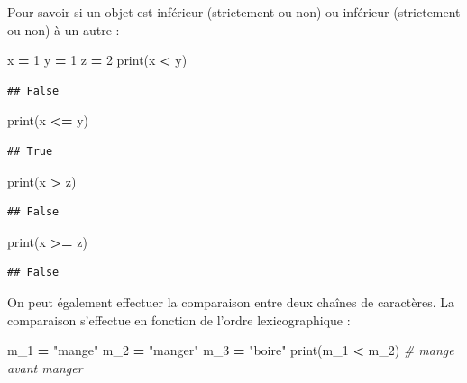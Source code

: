 \documentclass[12pt,]{book}
\newenvironment{Shaded}{\begin{snugshade}}{\end{snugshade}}
\newcommand{\DecValTok}[1]{\textcolor[rgb]{0.00,0.00,0.81}{#1}}
\newcommand{\StringTok}[1]{\textcolor[rgb]{0.31,0.60,0.02}{#1}}
\newcommand{\CommentTok}[1]{\textcolor[rgb]{0.56,0.35,0.01}{\textit{#1}}}
\newcommand{\OperatorTok}[1]{\textcolor[rgb]{0.81,0.36,0.00}{\textbf{#1}}}
\newcommand{\BuiltInTok}[1]{#1}
\newcommand{\NormalTok}[1]{#1}
\numberwithin{equation}{section}
\numberwithin{countremarque}{section}
\begin{document}
Pour savoir si un objet est inférieur (strictement ou non) ou inférieur
(strictement ou non) à un autre :

\begin{Shaded}
\begin{Highlighting}[]
\NormalTok{x }\OperatorTok{=} \DecValTok{1}
\NormalTok{y }\OperatorTok{=} \DecValTok{1}
\NormalTok{z }\OperatorTok{=} \DecValTok{2}
\BuiltInTok{print}\NormalTok{(x }\OperatorTok{<}\NormalTok{ y)}
\end{Highlighting}
\end{Shaded}

\begin{lstlisting}
## False
\end{lstlisting}

\begin{Shaded}
\begin{Highlighting}[]
\BuiltInTok{print}\NormalTok{(x }\OperatorTok{<=}\NormalTok{ y)}
\end{Highlighting}
\end{Shaded}

\begin{lstlisting}
## True
\end{lstlisting}

\begin{Shaded}
\begin{Highlighting}[]
\BuiltInTok{print}\NormalTok{(x }\OperatorTok{>}\NormalTok{ z)}
\end{Highlighting}
\end{Shaded}

\begin{lstlisting}
## False
\end{lstlisting}

\begin{Shaded}
\begin{Highlighting}[]
\BuiltInTok{print}\NormalTok{(x }\OperatorTok{>=}\NormalTok{ z)}
\end{Highlighting}
\end{Shaded}

\begin{lstlisting}
## False
\end{lstlisting}

On peut également effectuer la comparaison entre deux chaînes de
caractères. La comparaison s'effectue en fonction de l'ordre
lexicographique :

\begin{Shaded}
\begin{Highlighting}[]
\NormalTok{m_1 }\OperatorTok{=} \StringTok{"mange"}
\NormalTok{m_2 }\OperatorTok{=} \StringTok{"manger"}
\NormalTok{m_3 }\OperatorTok{=} \StringTok{"boire"}
\BuiltInTok{print}\NormalTok{(m_1 }\OperatorTok{<}\NormalTok{ m_2) }\CommentTok{# mange avant manger}
\end{Highlighting}
\end{Shaded}
\end{document}
